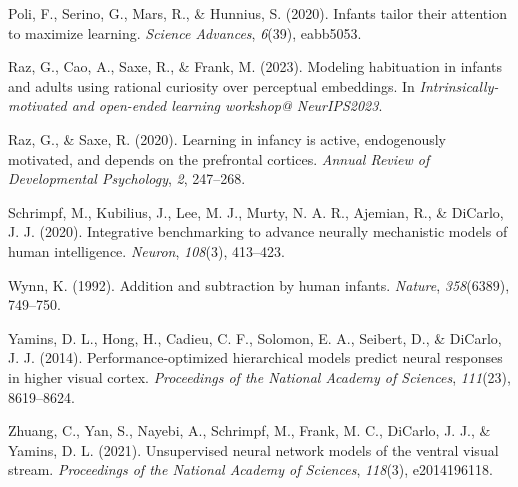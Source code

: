 \documentclass[10pt, letterpaper]{article}
\newenvironment{CSLReferences}%
  {}%
  {\par}
\begin{document}
\begin{CSLReferences}{1}{0}
\leavevmode{}%
Poli, F., Serino, G., Mars, R., \& Hunnius, S. (2020). Infants tailor
their attention to maximize learning. \emph{Science Advances},
\emph{6}(39), eabb5053.

\leavevmode{}%
Raz, G., Cao, A., Saxe, R., \& Frank, M. (2023). Modeling habituation in
infants and adults using rational curiosity over perceptual embeddings.
In \emph{Intrinsically-motivated and open-ended learning workshop@
NeurIPS2023}.

\leavevmode{}%
Raz, G., \& Saxe, R. (2020). Learning in infancy is active, endogenously
motivated, and depends on the prefrontal cortices. \emph{Annual Review
of Developmental Psychology}, \emph{2}, 247--268.

\leavevmode{}%
Schrimpf, M., Kubilius, J., Lee, M. J., Murty, N. A. R., Ajemian, R., \&
DiCarlo, J. J. (2020). Integrative benchmarking to advance neurally
mechanistic models of human intelligence. \emph{Neuron}, \emph{108}(3),
413--423.

\leavevmode{}%
Wynn, K. (1992). Addition and subtraction by human infants.
\emph{Nature}, \emph{358}(6389), 749--750.

\leavevmode{}%
Yamins, D. L., Hong, H., Cadieu, C. F., Solomon, E. A., Seibert, D., \&
DiCarlo, J. J. (2014). Performance-optimized hierarchical models predict
neural responses in higher visual cortex. \emph{Proceedings of the
National Academy of Sciences}, \emph{111}(23), 8619--8624.

\leavevmode{}%
Zhuang, C., Yan, S., Nayebi, A., Schrimpf, M., Frank, M. C., DiCarlo, J.
J., \& Yamins, D. L. (2021). Unsupervised neural network models of the
ventral visual stream. \emph{Proceedings of the National Academy of
Sciences}, \emph{118}(3), e2014196118.

\end{CSLReferences}


\end{document}
